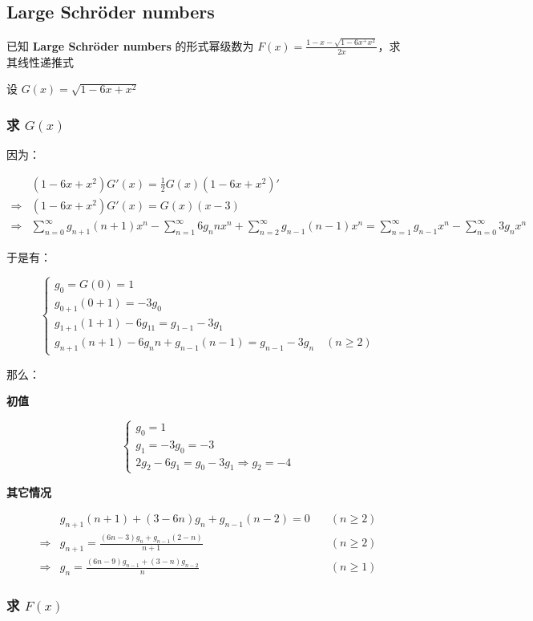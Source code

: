 \documentclass[UTF8]{article}
\begin{document}
\subsection{Large Schröder numbers}

已知 \textbf{Large Schröder numbers} 的形式幂级数为 $F(x)=\frac{1-x-\sqrt{1-6x^+x^2}}{2x}$，求其线性递推式

设 $G(x)=\sqrt{1-6x+x^2}$

\subsubsection{求 $G(x)$}

因为：

$$
\begin{aligned}
&(1-6x+x^2)G'(x)=\frac{1}{2}G(x)(1-6x+x^2)' \\
\Rightarrow &(1-6x+x^2)G'(x)=G(x)(x-3) \\
\Rightarrow &\sum_{n=0}^{\infty}g_{n+1}(n+1)x^{n}-\sum_{n=1}^{\infty}6g_{n}nx^n+\sum_{n=2}^{\infty}g_{n-1}(n-1)x^n=\sum_{n=1}^{\infty}g_{n-1}x^n-\sum_{n=0}^{\infty} 3g_nx^n
\end{aligned}
$$

于是有：

$$
\begin{cases}
g_0=G(0)=1 \\
g_{0+1}(0+1)=-3g_0 \\
g_{1+1}(1+1)-6g_11=g_{1-1}-3g_1 \\
g_{n+1}(n+1)-6g_nn+g_{n-1}(n-1)=g_{n-1}-3g_n \quad (n \ge 2)
\end{cases}
$$

那么：

\textbf{初值}

$$
\begin{cases}
g_0=1 \\
g_1=-3g_0=-3 \\
2g_2-6g_1=g_0-3g_1 \Rightarrow g_2=-4
\end{cases}
$$

\textbf{其它情况}

$$
\begin{aligned}
&g_{n+1}(n+1)+(3-6n)g_n+g_{n-1}(n-2)=0 \quad & (n \ge 2) \\
\Rightarrow &g_{n+1}=\frac{(6n-3)g_n+g_{n-1}(2-n)}{n+1} \quad & (n \ge 2) \\
\Rightarrow &g_{n}=\frac{(6n-9)g_{n-1}+(3-n)g_{n-2}}{n} \quad & (n \ge 1)
\end{aligned}
$$

\subsubsection{求 $F(x)$}
\end{document}
